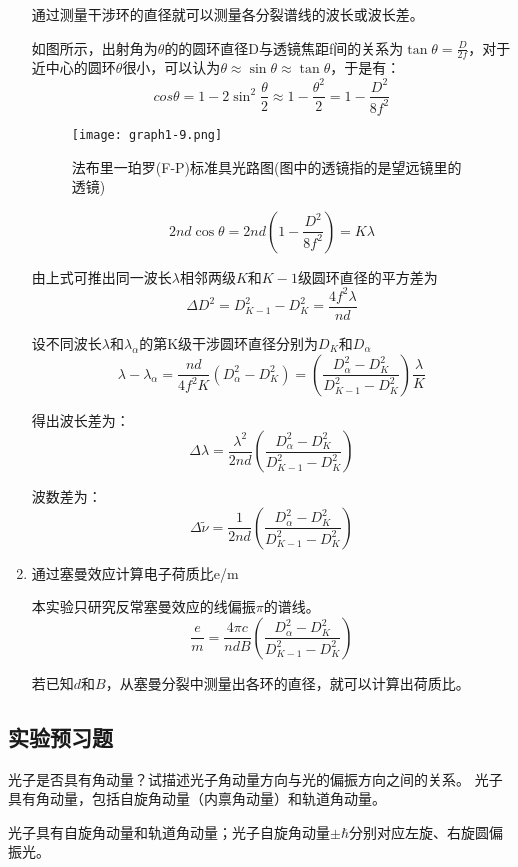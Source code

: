 \documentclass[dvipsnames, svgnames,a4paper,11pt]{article}
\begin{document}
\begin{enumerate}
			通过测量干涉环的直径就可以测量各分裂谱线的波长或波长差。

			如图所示，出射角为$\theta$的的圆环直径D与透镜焦距f间的关系为$\tan{\theta}=\frac{D}{2f}$，对于近中心的圆环$\theta$很小，可以认为$\theta\approx\sin{\theta}\approx\tan{\theta}$，于是有：
			\[
				cos\theta = 1 - 2 \sin^2\frac{\theta}{2} \approx 1 - \frac{\theta^2}{2} = 1 - \frac{D^2}{8f^2}	
			\]

			\begin{figure}[H]
				\centering
				\texttt{[image: graph1-9.png]}
				\caption{法布里一珀罗(F-P)标准具光路图(图中的透镜指的是望远镜里的透镜)}
		
			\end{figure}

			\[
				2 n d \cos \theta = 2 n d (1 - \frac{D^2}{8f^2}) = K \lambda	
			\]

			由上式可推出同一波长$\lambda$相邻两级$K$和$K - 1$级圆环直径的平方差为
			\[
				\Delta D^2 = D^2_{K-1} - D^2_{K} = \frac{4 f^2 \lambda}{n d}	
			\]

			设不同波长$\lambda$和$\lambda_{\alpha}$的第K级干涉圆环直径分别为$D_K$和$D_{\alpha}$
			\[
				\lambda - \lambda_\alpha = \frac{nd}{4 f^2 K}(D^2_\alpha - D^2_K) = (\frac{D^2_\alpha - D^2_K}{D^2_{K-1} - D^2_{K}})\frac{\lambda}{K}	
			\]

			得出波长差为：
			\[
				\Delta \lambda = \frac{\lambda^2}{2 n d}(\frac{D^2_\alpha - D^2_K}{D^2_{K-1} - D^2_{K}})
			\]
			
			波数差为：
			\[
				\Delta \tilde{\nu} = \frac{1}{2 n d}(\frac{D^2_\alpha - D^2_K}{D^2_{K-1} - D^2_{K}})
			\]

		\item 通过塞曼效应计算电子荷质比e/m
		
			本实验只研究反常塞曼效应的线偏振$\pi$的谱线。
			\[
				\frac{e}{m} = \frac{4\pi c}{n d B}(\frac{D^2_\alpha - D^2_K}{D^2_{K-1} - D^2_{K}})
			\]
			
			若已知$d$和$B$，从塞曼分裂中测量出各环的直径，就可以计算出荷质比。
	\end{enumerate}

	
	
	
	\subsection{实验预习题}
	
	\begin{question}
		光子是否具有角动量？试描述光子角动量方向与光的偏振方向之间的关系。
光子具有角动量，包括自旋角动量（内禀角动量）和轨道角动量。

	\end{question}
	光子具有自旋角动量和轨道角动量；光子自旋角动量$\pm\hbar$分别对应左旋、右旋圆偏振光。
\end{document}
